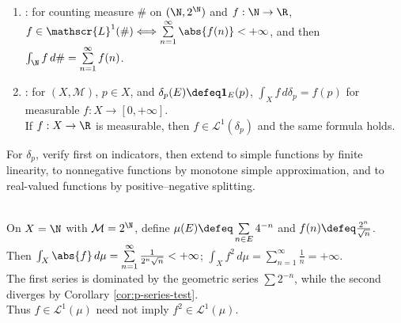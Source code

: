 \begin{example} \label{ex:counting-and-unit-mass-integrals} 
\begin{enumerate}[label=(\roman*)]
\setlength{\itemsep}{0pt}
\item {}: for counting measure $\#$ on $(\N,2^\N)$ and $f:\N\to\R$,\\
$f\in\mathscr{L}^1(\#)\Longleftrightarrow\sum\limits_{n=1}^{\infty}\abs{f(n)}<+\infty$, and then $\int_{\N}f\,d\#=\sum\limits_{n=1}^{\infty}f(n)$.
\item {}: for $(X,\mathcal{M})$, $p\in X$, and $\delta_p(E)\defeq\mathbf{1}_E(p)$, $\int_Xf\,d\delta_p=f(p)$ for measurable $f:X\to[0,+\infty]$.\\
If $f:X\to\R$ is measurable, then $f\in\mathscr{L}^1(\delta_p)$ and the same formula holds.
\end{enumerate}
For $\delta_p$, verify first on indicators, then extend to simple functions by finite linearity, to nonnegative functions by monotone simple approximation, and to real-valued functions by positive--negative splitting.
\end{example}

\begin{example} \label{ex:l1-not-closed-under-squaring} \\
On $X=\N$ with $\mathcal{M}=2^\N$, define $\mu(E)\defeq\sum\limits_{n\in E}4^{-n}$ and $f(n)\defeq\frac{2^n}{\sqrt{n}}$.\\
Then $\int_X\abs{f}\,d\mu=\sum\limits_{n=1}^{\infty}\frac{1}{2^n\sqrt{n}}<+\infty$; $\int_X f^2\,d\mu=\sum\limits_{n=1}^{\infty}\frac{1}{n}=+\infty$.\\
The first series is dominated by the geometric series $\sum2^{-n}$, while the second diverges by Corollary \ref{cor:p-series-test}.\\
Thus $f\in\mathscr{L}^1(\mu)$ need not imply $f^2\in\mathscr{L}^1(\mu)$.
\end{example}
